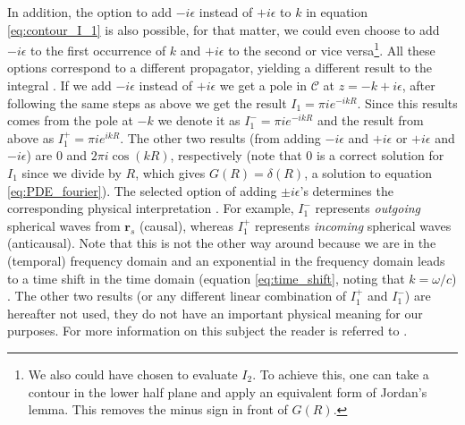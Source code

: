 In addition, the option to add $-i\epsilon$ instead of $+i\epsilon$ to $k$ in equation \ref{eq:contour_I_1} is also possible, for that matter, we could even choose to add $-i\epsilon$ to the first occurrence of $k$ and $+i\epsilon$ to the second or vice versa\footnote{We also could have chosen to evaluate $I_2$. To achieve this, one can take a contour in the lower half plane and apply an equivalent form of Jordan's lemma. This removes the minus sign in front of $G(R)$.}.
All these options correspond to a different propagator, yielding a different result to the integral \cite[Section 3.6]{griffel}.
If we add $-i\epsilon$ instead of $+i\epsilon$ we get a pole in $\mathcal C$ at $z=-k+i\epsilon$, after following the same steps as above we get the result $I_1 = \pi i e^{-ikR}$.
Since this results comes from the pole at $-k$ we denote it as $I_1^{-} = \pi i e^{-ikR}$ and the result from above as $I_1^{+} = \pi i e^{ikR}$.
The other two results (from adding $-i\epsilon$ and $+i\epsilon$ or $+i\epsilon$ and $-i\epsilon$) are $0$ and $2 \pi i \cos(kR)$, respectively (note that $0$ is a correct solution for $I_1$ since we divide by $R$, which gives $G(R)=\delta(R)$, a solution to equation \ref{eq:PDE_fourier}).
The selected option of adding $\pm i \epsilon$'s determines the corresponding physical interpretation \cite[Section 11.2.2]{zettili}.
For example, $I_1^{-}$ represents \textit{outgoing} spherical waves from $\mathbf r_s$ (causal), whereas $I_1^{+}$ represents \textit{incoming} spherical waves (anticausal).
Note that this is not the other way around because we are in the (temporal) frequency domain and an exponential in the frequency domain leads to a time shift in the time domain (equation \ref{eq:time_shift}, noting that $k=\omega/c$) \cite[Section 4.3]{Book_Eric}.
The other two results (or any different linear combination of $I_1^+$ and $I_1^-$) are hereafter not used, they do not have an important physical meaning for our purposes.
For more information on this subject the reader is referred to \cites[Section 3.6]{griffel}[Section 11.2]{zettili}[Section 4.3]{Book_Eric}{Greens1, Greens0, Greens2, Greens3, Greens4, Greens5}.


